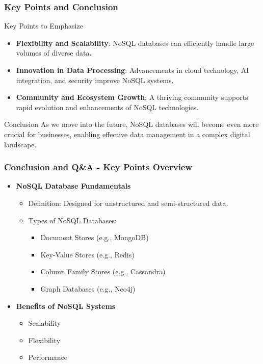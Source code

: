 \documentclass[aspectratio=169]{beamer}
\begin{document}
\begin{frame}[fragile]
    \frametitle{Key Points and Conclusion}
    \begin{block}{Key Points to Emphasize}
        \begin{itemize}
            \item \textbf{Flexibility and Scalability}: NoSQL databases can efficiently handle large volumes of diverse data.
            \item \textbf{Innovation in Data Processing}: Advancements in cloud technology, AI integration, and security improve NoSQL systems.
            \item \textbf{Community and Ecosystem Growth}: A thriving community supports rapid evolution and enhancements of NoSQL technologies.
        \end{itemize}
    \end{block}
    
    \begin{block}{Conclusion}
        As we move into the future, NoSQL databases will become even more crucial for businesses, enabling effective data management in a complex digital landscape.
    \end{block}
\end{frame}

\begin{frame}[fragile]
    \frametitle{Conclusion and Q\&A - Key Points Overview}
    \begin{itemize}
        \item \textbf{NoSQL Database Fundamentals}
            \begin{itemize}
                \item Definition: Designed for unstructured and semi-structured data.
                \item Types of NoSQL Databases:
                    \begin{itemize}
                        \item Document Stores (e.g., MongoDB)
                        \item Key-Value Stores (e.g., Redis)
                        \item Column Family Stores (e.g., Cassandra)
                        \item Graph Databases (e.g., Neo4j)
                    \end{itemize}
            \end{itemize}
        \item \textbf{Benefits of NoSQL Systems}
            \begin{itemize}
                \item Scalability
                \item Flexibility
                \item Performance
            \end{itemize}
    \end{itemize}
\end{frame}
\end{document}
